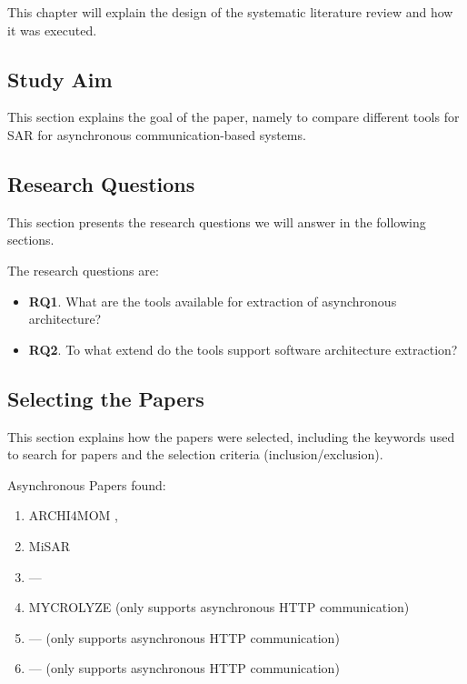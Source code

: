 This chapter will explain the design of the systematic literature review and how it was executed.

\subsection{Study Aim}
\label{sec:StudyDesign:StudyAim}
This section explains the goal of the paper, namely to compare different tools for SAR for asynchronous communication-based systems.

\subsection{Research Questions}
\label{sec:StudyDesign:ResearchQuestions}
This section presents the research questions we will answer in the following sections.

The research questions are: \\
\begin{itemize}
	\item \textbf{RQ1}. What are the tools available for extraction of asynchronous architecture?
	\item \textbf{RQ2}. To what extend do the tools support software architecture extraction?
\end{itemize}

\subsection{Selecting the Papers}
\label{sec:StudyDesign:SelectingPapers}
This section explains how the papers were selected, including the keywords used to search for papers and the selection criteria (inclusion/exclusion).

Asynchronous Papers found:
\begin{enumerate}
	\item ARCHI4MOM \cite{Singh2022ARCHI4MOM}, \cite{Singh2021}
	\item MiSAR \cite{Alshuqayran2018MiSAR}
	\item --- \cite{Brosig2011}
	\item MYCROLYZE \cite{Kleehaus2018} (only supports asynchronous HTTP communication)
	\item --- \cite{Mayer2018} (only supports asynchronous HTTP communication)
	\item --- \cite{Ntentos2021} (only supports asynchronous HTTP communication)
\end{enumerate}